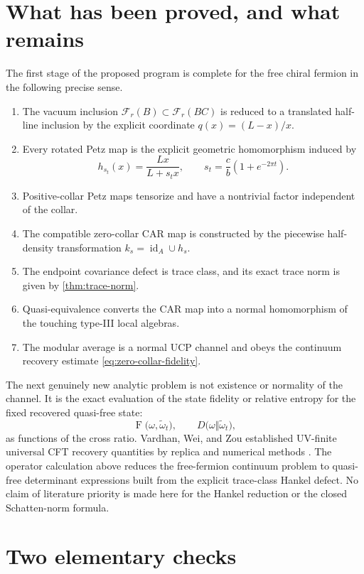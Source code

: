 \documentclass[11pt]{article}
\theoremstyle{accent}
\theoremstyle{definition}
\newcommand{\cF}{\mathcal{F}}
\newcommand{\id}{\operatorname{id}}
\newcommand{\Fid}{\operatorname{F}}
\begin{document}
\section{What has been proved, and what remains}

The first stage of the proposed program is complete for the free chiral fermion in the following precise sense.

\begin{enumerate}
  \item The vacuum inclusion \(\cF_r(B)\subset\cF_r(BC)\) is reduced to a translated half-line inclusion by the explicit coordinate \(q(x)=(L-x)/x\).
  \item Every rotated Petz map is the explicit geometric homomorphism induced by
  \[
    h_{s_t}(x)=\frac{Lx}{L+s_tx},
    \qquad
    s_t=\frac cb(1+e^{-2\pi t}).
  \]
  \item Positive-collar Petz maps tensorize and have a nontrivial factor independent of the collar.
  \item The compatible zero-collar CAR map is constructed by the piecewise half-density transformation \(k_s=\id_A\cup h_s\).
  \item The endpoint covariance defect is trace class, and its exact trace norm is given by \cref{thm:trace-norm}.
  \item Quasi-equivalence converts the CAR map into a normal homomorphism of the touching type-III local algebras.
  \item The modular average is a normal UCP channel and obeys the continuum recovery estimate \eqref{eq:zero-collar-fidelity}.
\end{enumerate}

The next genuinely new analytic problem is not existence or normality of the channel.  It is the exact evaluation of the state fidelity or relative entropy for the fixed recovered quasi-free state:
\[
 \Fid\bigl(\omega,\widetilde\omega_t\bigr),
 \qquad
 D\bigl(\omega\Vert\widetilde\omega_t\bigr),
\]
as functions of the cross ratio.  Vardhan, Wei, and Zou established UV-finite universal CFT recovery quantities by replica and numerical methods \cite{VardhanWeiZou}.  The operator calculation above reduces the free-fermion continuum problem to quasi-free determinant expressions built from the explicit trace-class Hankel defect.  No claim of literature priority is made here for the Hankel reduction or the closed Schatten-norm formula.

\appendix
\section{Two elementary checks}
\end{document}
